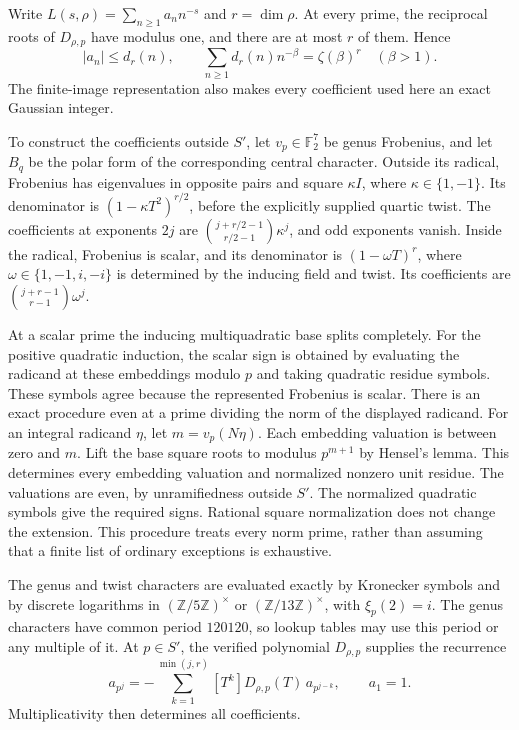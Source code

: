 Write $L(s,\rho)=\sum_{n\geq1}a_n n^{-s}$ and $r=\dim\rho$.
At every prime, the reciprocal roots of $D_{\rho,p}$ have modulus
one, and there are at most $r$ of them. Hence
\begin{equation}\label{an:divisor-bound}
 |a_n|\leq d_r(n),\qquad
 \sum_{n\geq1}d_r(n)n^{-\beta}=\zeta(\beta)^r
 \quad(\beta>1).
\end{equation}
The finite-image representation also makes every coefficient used here
an exact Gaussian integer.

To construct the coefficients outside $S'$, let
$v_p\in\mathbb F_2^7$ be genus Frobenius, and let $B_q$ be the polar
form of the corresponding central character. Outside its radical,
Frobenius has eigenvalues in opposite pairs and square $\kappa I$,
where $\kappa\in\{1,-1\}$. Its denominator is
$(1-\kappa T^2)^{r/2}$, before the explicitly supplied quartic twist.
The coefficients at exponents $2j$ are
$\binom{j+r/2-1}{r/2-1}\kappa^j$, and odd exponents vanish.
Inside the radical, Frobenius is scalar, and its denominator is
$(1-\omega T)^r$, where $\omega\in\{1,-1,i,-i\}$ is determined
by the inducing field and twist. Its coefficients are
$\binom{j+r-1}{r-1}\omega^j$.

At a scalar prime the inducing multiquadratic base splits completely.
For the positive quadratic induction, the scalar sign is obtained by
evaluating the radicand at these embeddings modulo $p$ and taking
quadratic residue symbols. These symbols agree
because the represented Frobenius is scalar. There is an exact
procedure even at a prime dividing the norm of the displayed radicand.
For an integral radicand $\eta$, let $m=v_p(N\eta)$. Each embedding
valuation is between zero and $m$. Lift the base square roots to
modulus $p^{m+1}$ by Hensel's lemma. This determines every embedding
valuation and normalized nonzero unit residue. The valuations are
even, by unramifiedness outside $S'$. The normalized quadratic symbols
give the required signs. Rational square normalization does not change
the extension. This procedure treats every norm prime, rather than
assuming that a finite list of ordinary exceptions is exhaustive.

The genus and twist characters are evaluated exactly by Kronecker
symbols and by discrete logarithms in $(\mathbb Z/5\mathbb Z)^\times$
or $(\mathbb Z/13\mathbb Z)^\times$, with $\xi_p(2)=i$.
The genus characters have common period $120120$, so lookup tables may
use this period or any multiple of it. At $p\in S'$, the
verified polynomial $D_{\rho,p}$ supplies the recurrence
\[
 a_{p^j}=-\sum_{k=1}^{\min(j,r)}[T^k]D_{\rho,p}(T)\,a_{p^{j-k}},
 \qquad a_1=1.
\]
Multiplicativity then determines all coefficients.

